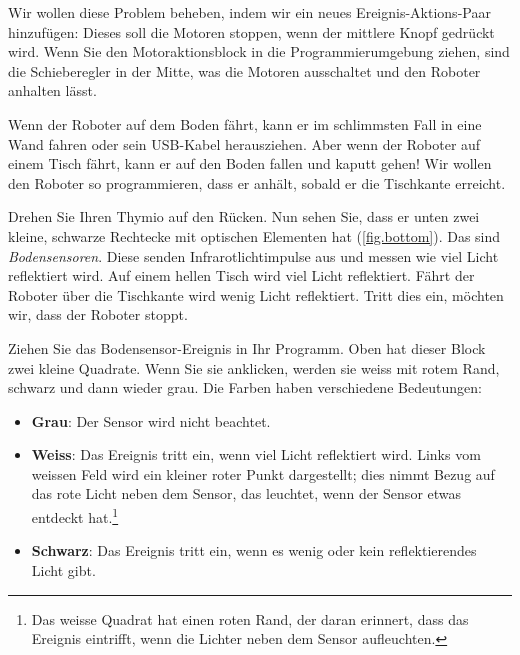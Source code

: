 Wir wollen diese Problem beheben, indem wir ein neues Ereignis-Aktions-Paar
hinzufügen: 
Dieses soll die Motoren stoppen, wenn der mittlere Knopf gedrückt wird. Wenn Sie den Motoraktionsblock in die Programmierumgebung ziehen, sind die Schieberegler in der Mitte, was die Motoren ausschaltet und den Roboter anhalten lässt.


Wenn der Roboter auf dem Boden fährt, kann er im schlimmsten Fall in eine Wand
fahren oder sein USB-Kabel herausziehen. Aber wenn der Roboter auf einem Tisch
fährt, kann er auf den Boden fallen und kaputt gehen! Wir wollen den Roboter so
programmieren, dass er anhält, sobald er die Tischkante erreicht.


Drehen Sie Ihren Thymio auf den Rücken. Nun sehen Sie, dass er unten zwei
kleine, schwarze Rechtecke mit optischen Elementen hat (\cref{fig.bottom}).
Das sind \emph{Bodensensoren}. Diese senden Infrarotlichtimpulse aus und messen wie viel Licht reflektiert wird. 
Auf einem hellen Tisch wird viel Licht reflektiert. Fährt der Roboter über die Tischkante wird wenig Licht reflektiert. Tritt dies ein, möchten wir, dass der Roboter stoppt.


Ziehen Sie das Bodensensor-Ereignis 
in Ihr Programm. Oben hat dieser Block zwei kleine Quadrate. Wenn Sie sie anklicken, werden sie weiss mit rotem Rand, schwarz und dann wieder grau. Die Farben haben verschiedene Bedeutungen:

\begin{itemize}

\item \textbf{Grau}: Der Sensor wird nicht beachtet.

\item \textbf{Weiss}: Das Ereignis tritt ein, wenn viel Licht reflektiert wird. \label{p.proximity-colors1} Links vom weissen Feld wird ein kleiner roter Punkt dargestellt; dies nimmt Bezug auf das rote Licht neben dem Sensor, das leuchtet, wenn der Sensor etwas entdeckt hat.\footnote{Das weisse Quadrat hat einen roten Rand, der daran erinnert, dass das Ereignis eintrifft, wenn die Lichter neben dem Sensor aufleuchten.}

\item \textbf{Schwarz}: Das Ereignis tritt ein, wenn es wenig oder kein reflektierendes Licht gibt.

\end{itemize}

